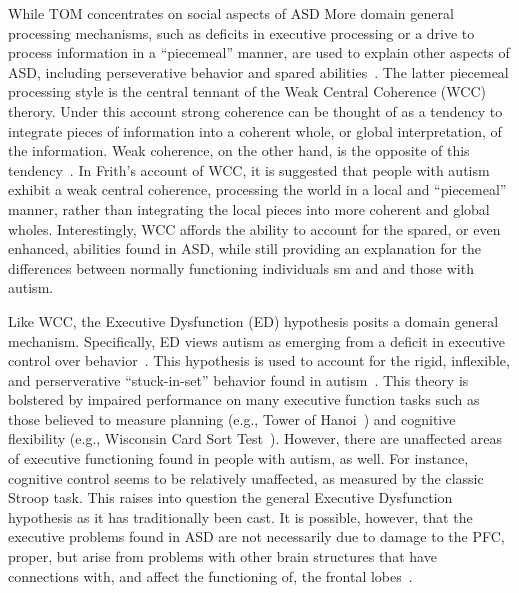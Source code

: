 While TOM concentrates on social aspects of ASD More domain general processing mechanisms, such as deficits in executive processing or a drive to process information in a ``piecemeal'' manner, are used to explain other aspects of ASD, including perseverative behavior and spared abilities~\cite{HillEL:2004:AutismExecutiveDysfunction}.  The latter piecemeal processing style is the central tennant of the Weak Central Coherence (WCC)~\cite{HappeF:1999:WCC,RefWorks:116} therory.  Under this account strong coherence can be thought of as a tendency to integrate pieces of information into a coherent whole, or global interpretation, of the information. Weak coherence, on the other hand, is the opposite of this tendency~\cite{WitkinHA:1971:EFT}.  In Frith's account of WCC, it is suggested that people with autism exhibit a weak central coherence, processing the world in a local and ``piecemeal'' manner, rather than integrating the local pieces into more coherent and global wholes.  Interestingly, WCC affords the ability to account for the spared, or even enhanced, abilities found in ASD, while still providing an explanation for the differences between normally functioning individuals sm and and those with autism. 

Like WCC, the Executive Dysfunction (ED) hypothesis posits a domain general mechanism.  Specifically, ED views autism as emerging from a deficit in executive control over behavior~\cite{HughesC:1994:AutismExecutiveDysfunction,Ozonoff:1991:AutismExecutiveDysfunction}. This hypothesis is used to account for the rigid, inflexible, and perserverative ``stuck-in-set'' behavior found in autism~\cite{HillEL:2004:AutismExecutiveDysfunction}.  This theory is bolstered by impaired performance on many executive function tasks such as those believed to measure planning (e.g., Tower of Hanoi~\cite{HughesC:1994:AutismExecutiveDysfunction,Ozonoff:1999:AutismStroopWCST}) and cognitive flexibility (e.g., Wisconsin Card Sort Test~\cite{BennettoL:1996:AutismPlanningWCST}).  However, there are unaffected areas of executive functioning found in people with autism, as well.  For instance, cognitive control seems to be relatively unaffected, as measured by the classic Stroop task.  This raises into question the general Executive Dysfunction hypothesis as it has traditionally been cast.  It is possible, however, that the executive problems found in ASD are not necessarily due to damage to the PFC, proper, but arise from problems with other brain structures that have connections with, and affect the functioning of, the frontal lobes~\cite{RobbinsTW:1997:AutismNeurological}.  


